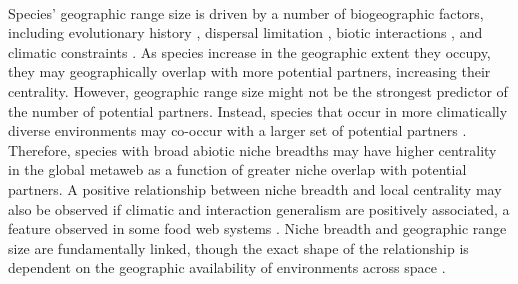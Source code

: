 \documentclass[12pt]{article}
\begin{document}
\paragraph*{}
Species' geographic range size is driven by a number of biogeographic factors, including evolutionary history \citep{webb2000geographic, alzate2025evolutionary}, dispersal limitation \citep{alzate2022understanding}, biotic interactions \citep{pigot2013species,galiana2023climate}, and climatic constraints \citep{hausharter2023niche}. As species increase in the geographic extent they occupy, they may geographically overlap with more potential partners, increasing their centrality. However, geographic range size might not be the strongest predictor of the number of potential partners. Instead, species that occur in more climatically diverse environments may co-occur with a larger set of potential partners \citep{slatyer2013niche, batstone2018using}. Therefore, species with broad abiotic niche breadths may have higher centrality in the global metaweb as a function of greater niche overlap with potential partners. A positive relationship between niche breadth and local centrality may also be observed if climatic and interaction generalism are positively associated, a feature observed in some food web systems \citep{slatyer2013niche}. Niche breadth and geographic range size are fundamentally linked, though the exact shape of the relationship is dependent on the geographic availability of environments across space \citep{dallas2025linking}.



\end{document}

